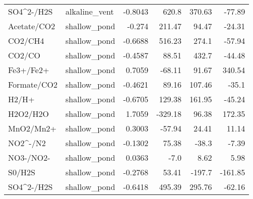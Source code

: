 \begin{tabular}{l l r r r r}
SO4^2-/H2S & alkaline_vent & -0.8043 & 620.8 & 370.63 & -77.89 \\ 
Acetate/CO2 & shallow_pond & -0.274 & 211.47 & 94.47 & -24.31 \\ 
CO2/CH4 & shallow_pond & -0.6688 & 516.23 & 274.1 & -57.94 \\ 
CO2/CO & shallow_pond & -0.4587 & 88.51 & 432.7 & -44.48 \\ 
Fe3+/Fe2+ & shallow_pond & 0.7059 & -68.11 & 91.67 & 340.54 \\ 
Formate/CO2 & shallow_pond & -0.4621 & 89.16 & 107.46 & -35.1 \\ 
H2/H+ & shallow_pond & -0.6705 & 129.38 & 161.95 & -45.24 \\ 
H2O2/H2O & shallow_pond & 1.7059 & -329.18 & 96.38 & 172.35 \\ 
MnO2/Mn2+ & shallow_pond & 0.3003 & -57.94 & 24.41 & 11.14 \\ 
NO2^-/N2 & shallow_pond & -0.1302 & 75.38 & -38.3 & -7.39 \\ 
NO3-/NO2- & shallow_pond & 0.0363 & -7.0 & 8.62 & 5.98 \\ 
S0/H2S & shallow_pond & -0.2768 & 53.41 & -197.7 & -161.85 \\ 
SO4^2-/H2S & shallow_pond & -0.6418 & 495.39 & 295.76 & -62.16 \\ 
\bottomrule
\end{tabular}
